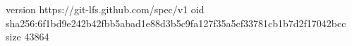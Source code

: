 version https://git-lfs.github.com/spec/v1
oid sha256:6f1bd9e242b42fbb5abad1e88d3b5c9fa127f35a5cf33781cb1b7d2f17042bcc
size 43864
